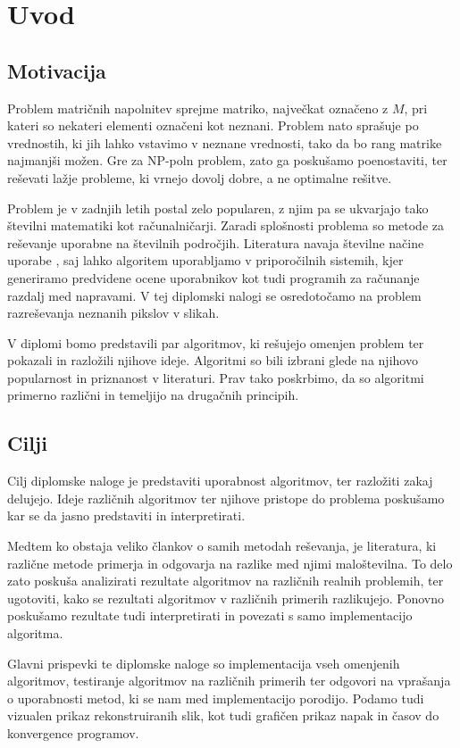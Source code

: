 \chapter{Uvod}
\section{Motivacija}
Problem matričnih napolnitev sprejme matriko, največkat označeno z $M$, pri kateri so nekateri elementi označeni kot neznani. Problem nato sprašuje po vrednostih, ki jih lahko vstavimo v neznane vrednosti, tako da bo rang matrike najmanjši možen. Gre za NP-poln problem, zato ga poskušamo poenostaviti, ter reševati lažje probleme, ki vrnejo dovolj dobre, a ne optimalne rešitve. 

Problem je v zadnjih letih postal zelo popularen, z njim pa se ukvarjajo tako številni matematiki kot računalničarji. Zaradi splošnosti problema so metode za reševanje uporabne na številnih področjih. Literatura navaja številne načine uporabe \cite{Survey-NKS19}, saj lahko algoritem uporabljamo v priporočilnih sistemih, kjer generiramo predvidene ocene uporabnikov kot tudi programih za računanje razdalj med napravami. V tej diplomski nalogi se osredotočamo na problem razreševanja neznanih pikslov v slikah.

V diplomi bomo predstavili par algoritmov, ki rešujejo omenjen problem ter pokazali in razložili njihove ideje. Algoritmi so bili izbrani glede na njihovo popularnost in priznanost v literaturi. Prav tako poskrbimo, da so algoritmi primerno različni in temeljijo na drugačnih principih.

\section{Cilji}
Cilj diplomske naloge je predstaviti uporabnost algoritmov, ter razložiti zakaj delujejo. Ideje različnih algoritmov ter njihove pristope do problema poskušamo kar se da jasno predstaviti in interpretirati.

Medtem ko obstaja veliko člankov o samih metodah reševanja, je literatura, ki različne metode primerja in odgovarja na razlike med njimi maloštevilna. To delo zato poskuša analizirati rezultate algoritmov na različnih realnih problemih, ter ugotoviti, kako se rezultati algoritmov v različnih primerih razlikujejo. Ponovno poskušamo rezultate tudi interpretirati in povezati s samo implementacijo algoritma.

Glavni prispevki te diplomske naloge so implementacija vseh omenjenih algoritmov, testiranje algoritmov na različnih primerih ter odgovori na vprašanja o uporabnosti metod, ki se nam med implementacijo porodijo. Podamo tudi vizualen prikaz rekonstruiranih slik, kot tudi grafičen prikaz napak in časov do konvergence programov.


